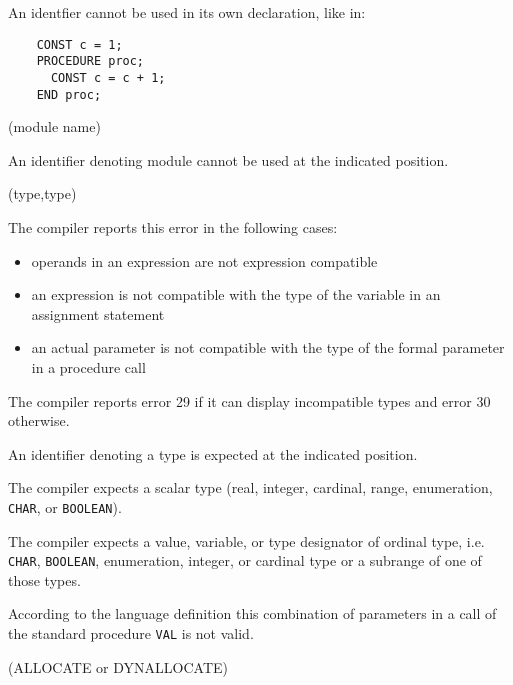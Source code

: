 An identfier cannot be used in its own declaration, like in:

\begin{verbatim}
    CONST c = 1;
    PROCEDURE proc;
      CONST c = c + 1;
    END proc;
\end{verbatim}

(module name)

An identifier denoting module cannot be used at the indicated position.

(type,type) \ifonline\else\\\fi
{}

The compiler reports this error in the following cases:
\begin{itemize}
\item operands in an expression are not expression compatible
\item an expression is not compatible with the type of the variable
      in an assignment statement
\item an actual parameter is not compatible with the type of the formal parameter
      in a procedure call
\end{itemize}

The compiler reports error 29 if it can display incompatible types and error 30
otherwise.


An identifier denoting a type is expected at the indicated position.


The compiler expects a scalar type (real, integer,
cardinal, range, enumeration, \verb'CHAR', or \verb'BOOLEAN').


The compiler expects a value, variable, or type designator of ordinal
type, i.e. \verb'CHAR', \verb'BOOLEAN', enumeration, integer, or cardinal type or
a subrange of one of those types.


According to the language definition this combination of parameters
in a call of the standard procedure \verb'VAL' is not valid.

(ALLOCATE or DYNALLOCATE)

